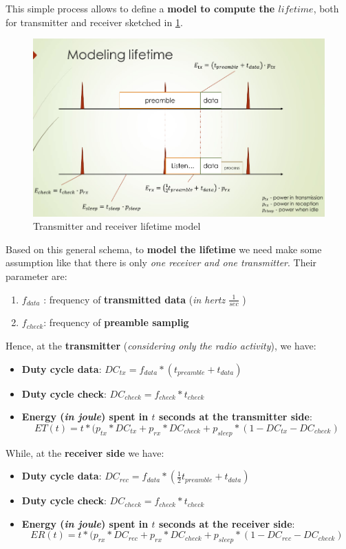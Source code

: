 \documentclass[10pt,a4paper]{report}
\theoremstyle{definition}
\begin{document}
This simple process allows to define a \textbf{model to compute the $lifetime$}, both for transmitter and receiver sketched in \ref{bmac-model}.
\begin{figure}
	\centering\includegraphics[scale=0.50]{images/Pasted image 20230405104440.png}
	\caption{Transmitter and receiver lifetime model}
	\label{bmac-model}
\end{figure}
Based on this general schema, to \textbf{model the lifetime} we need make some assumption like that there is only \textit{one receiver and one transmitter}. Their parameter are:
\begin{enumerate}
	\item 
	$f_{data}$ : frequency of \textbf{transmitted data} (\textit{in hertz $\frac{1}{sec}$} )
	\item 
	$f_{check}$: frequency of \textbf{preamble samplig}
\end{enumerate}

Hence, at the \textbf{transmitter} (\textit{considering only the radio activity}), we have:
\begin{itemize}
	\item 
	\textbf{Duty cycle data}: $DC_{tx} = f_{data}*(t_{preamble}+t_{data})$
	\item 
	\textbf{Duty cycle check}: $DC_{check} = f_{check}*t_{check}$
	\item 
	\textbf{Energy (\textit{in joule}) spent in $t$ seconds at the transmitter side}:
			\begin{equation}
	ET(t) = t * (p_{tx}*DC_{tx}+p_{rx}*DC_{check}+p_{sleep}*(1-DC_{tx}-DC_{check})
			\end{equation}
\end{itemize}

While, at the \textbf{receiver side} we have:
\begin{itemize}
	\item 
	\textbf{Duty cycle data}: $DC_{rec} = f_{data}*(\frac{1}{2}t_{preamble}+t_{data})$
	\item 
	\textbf{Duty cycle check}: $DC_{check} = f_{check}*t_{check}$
	\item 
	\textbf{Energy (\textit{in joule}) spent in $t$ seconds at the receiver side}:
		\begin{equation}
			ER(t) = t * (p_{rx}*DC_{rec}+p_{rx}*DC_{check}+p_{sleep}*(1-DC_{rec}-DC_{check})
	\end{equation}

\end{itemize}
\end{document}
